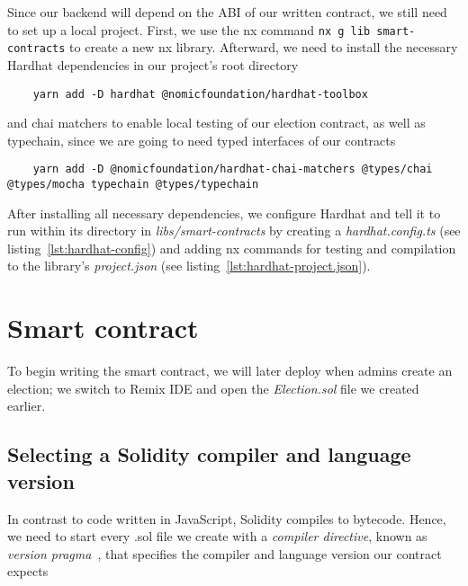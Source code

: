 Since our backend will depend on the \gls{ABI} of our written contract, we still need to set up a local project.
First, we use the nx command \texttt{nx g lib smart-contracts} to create a new nx library.
Afterward, we need to install the necessary Hardhat dependencies in our project's root directory

\begin{verbatim}
    yarn add -D hardhat @nomicfoundation/hardhat-toolbox
\end{verbatim}

and chai matchers to enable local testing of our election contract, as well as typechain, since we are going to need typed interfaces of our contracts

\begin{verbatim}
    yarn add -D @nomicfoundation/hardhat-chai-matchers @types/chai @types/mocha typechain @types/typechain
\end{verbatim}

After installing all necessary dependencies, we configure Hardhat and tell it to run within its directory in \emph{libs/smart-contracts} by creating a \emph{hardhat.config.ts} (see listing~\ref{lst:hardhat-config}) and adding nx commands for testing and compilation to the library's \emph{project.json} (see listing~\ref{lst:hardhat-project.json}).


\section{Smart contract}\label{sec:smart-contract}

To begin writing the smart contract, we will later deploy when admins create an election; we switch to Remix \gls{IDE} and open the \emph{Election.sol} file we created earlier.

\subsection{Selecting a Solidity compiler and language version}\label{subsec:selecting-a-solidity-compiler-and-language-version}

In contrast to code written in JavaScript, Solidity compiles to bytecode.
Hence, we need to start every .sol file we create with a \emph{compiler directive}, known as \emph{version pragma}~\autocite[135]{antonopoulos_mastering_2019}, that specifies the compiler and language version our contract expects

